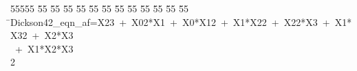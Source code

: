 %
%
\begin{tabbing}
55555 \= 55 \= 55 \= 55 \= 55 \= 55 \= 55 \= 55 \= 55 \= 55 \= 55 \= 55 \= 55 \= \>Dickson42\_eqn\_af=X23\ +\ X02*X1\ +\ X0*X12\ +\ X1*X22\ +\ X22*X3\ +\ X1*X32\ +\ X2*X3\\[0pt]
\ +\ X1*X2*X3\\[0pt]
2\>\end{tabbing}
